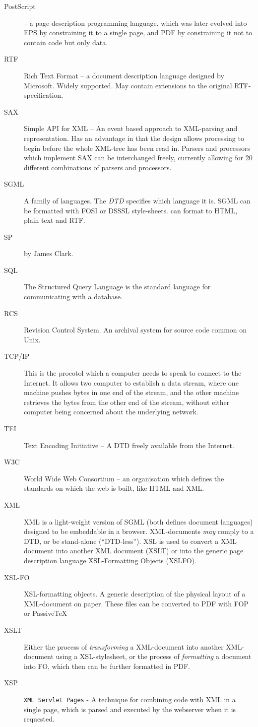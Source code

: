 \begin{description}
\item[PostScript] -- a page description programming language, which was later evolved into EPS by constraining it to a single page, and PDF by constraining it not to contain code but only data.
\item[RTF] Rich Text Format -- a document description language designed by Microsoft.  Widely supported.  May contain extensions to the original RTF-specification.
\item[SAX] Simple API for XML -- An event based approach to XML-parsing and representation.  Has an advantage in that the design allows processing to begin before the whole XML-tree has been read in.  Parsers and processors which implement SAX can be interchanged freely, currently allowing for 20 different combinations of parsers and processors.
\item[SGML] A family of languages.  The \textit{DTD} specifies which language it is.  SGML can be formatted with FOSI or DSSSL style-sheets.   can format to HTML, plain text and RTF.
\item[SP] {} by James Clark.
\item[SQL] The Structured Query Language is the standard language for communicating with a database.
\item[RCS] Revision Control System.  An archival system for source
  code common on Unix.
\item[TCP/IP] This is the procotol which a computer needs to speak to connect to the Internet.  It allows two computer to establish a data stream, where one machine pushes bytes in one end of the stream, and the other machine retrieves the bytes from the other end of the stream, without either computer being concerned about the underlying network.
\item[TEI] Text Encoding Initiative -- A DTD freely available from the Internet.
\item[W3C] World Wide Web Consortium -- an organisation which defines
  the standards on which the web is built, like HTML and XML.
\item[XML] XML is a light-weight version of SGML (both defines document languages) designed to be embeddable in a browser.  XML-documents \textit{may} comply to a DTD, or be stand-alone (``DTD-less'').  XSL is used to convert a XML document into another XML document (XSLT) or into the generic page description language XSL-Formatting Objects (XSLFO).
\item[XSL-FO] XSL-formatting objects.  A generic description of the physical layout of a XML-document on paper.  These files can be converted to PDF with FOP or PassiveTeX
\item[XSLT] Either the process of \textit{transforming} a XML-document into another XML-document using a XSL-stylesheet, or the process of \textit{formatting} a document into FO, which then can be further formatted in PDF.
\item[XSP] \texttt{XML Servlet Pages} - A technique for combining code with XML in a single page, which is parsed and executed by the webserver when it is requested.


\end{description}





